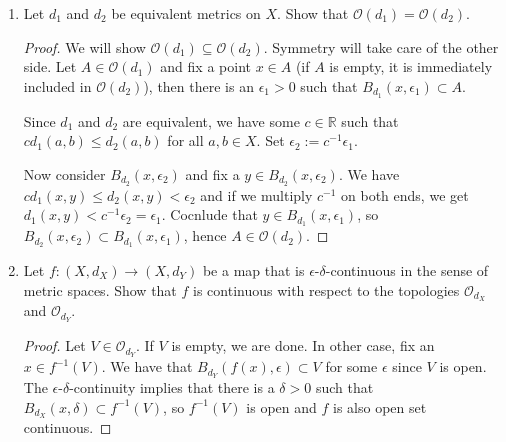 \documentclass[a4paper]{article}
\begin{document}
\begin{enumerate}
    \item Let \(d_1\) and \(d_2\) be equivalent metrics on \(X\). Show that \(\mathcal{O}(d_1) = \mathcal{O}(d_2)\).

    \begin{proof}
        We will show \(\mathcal{O}(d_1) \subseteq \mathcal{O}(d_2)\). Symmetry will take care of the other side. Let \(A \in \mathcal{O}(d_1)\) and fix a point \(x \in A\) (if \(A\) is empty, it is immediately included in \(\mathcal{O}(d_2)\)), then there is an \(\epsilon_1 > 0\) such that \(B_{d_1}(x, \epsilon_1) \subset A\).

        Since \(d_1\) and \(d_2\) are equivalent, we have some \(c \in \mathbb{R}\) such that \(c d_1(a, b) \leq d_2(a, b)\) for all \(a, b \in X\). Set \(\epsilon_2 := c^{-1} \epsilon_1\).

        Now consider \(B_{d_2}(x, \epsilon_2)\) and fix a \(y \in B_{d_2}(x, \epsilon_2)\). We have \(c d_1(x, y) \leq d_2(x, y) < \epsilon_2\) and if we multiply \(c^{-1}\) on both ends, we get \(d_1(x, y) < c^{-1} \epsilon_2 = \epsilon_1\). Cocnlude that \(y \in B_{d_1}(x, \epsilon_1)\), so \(B_{d_2}(x, \epsilon_2) \subset B_{d_1}(x, \epsilon_1)\), hence \(A \in \mathcal{O}(d_2)\).
    \end{proof}

    \item Let \(f: (X, d_X) \longrightarrow (X, d_Y)\) be a map that is \(\epsilon\)-\(\delta\)-continuous in the sense of metric spaces. Show that \(f\) is continuous with respect to the topologies \(\mathcal{O}_{d_X}\) and \(\mathcal{O}_{d_Y}\).
    
    \begin{proof}
        Let \(V \in \mathcal{O}_{d_Y}\). If \(V\) is empty, we are done. In other case, fix an \(x \in f^{-1}(V)\). We have that \(B_{d_Y}(f(x), \epsilon) \subset V\) for some \(\epsilon\) since \(V\) is open. The \(\epsilon\)-\(\delta\)-continuity implies that there is a \(\delta > 0\) such that \(B_{d_X}(x, \delta) \subset f^{-1}(V)\), so \(f^{-1}(V)\) is open and \(f\) is also open set continuous. 
    \end{proof}

\end{enumerate}    
\end{document}
